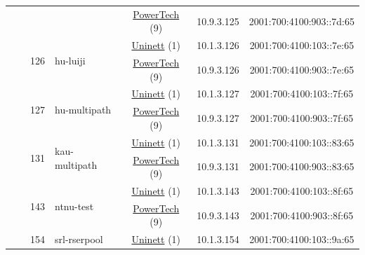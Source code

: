 \begin{small}
\begin{center}
\begin{longtable}{|c|c|c|c|c|c|c|c|}
  &  &  &  & \multicolumn{2}{|c|}{\tiny{\href{http://www.powertech.no}{PowerTech} (9)}} & \tiny{10.9.3.125} & \tiny{2001:700:4100:903::7d:65} \\* \cline{3-3}\cline{4-4}\cline{5-5}\cline{6-6}\cline{7-7}\cline{8-8}
  &  & \multirow{2}{*}{\tiny{126}} & \multicolumn{1}{|l|}{\multirow{2}{*}{\tiny{hu-luiji}}} & \multicolumn{2}{|c|}{\tiny{\href{https://www.uninett.no}{Uninett} (1)}} & \tiny{10.1.3.126} & \tiny{2001:700:4100:103::7e:65} \\* \cline{5-5}\cline{6-6}\cline{7-7}\cline{8-8}
  &  &  &  & \multicolumn{2}{|c|}{\tiny{\href{http://www.powertech.no}{PowerTech} (9)}} & \tiny{10.9.3.126} & \tiny{2001:700:4100:903::7e:65} \\* \cline{3-3}\cline{4-4}\cline{5-5}\cline{6-6}\cline{7-7}\cline{8-8}
  &  & \multirow{2}{*}{\tiny{127}} & \multicolumn{1}{|l|}{\multirow{2}{*}{\tiny{hu-multipath}}} & \multicolumn{2}{|c|}{\tiny{\href{https://www.uninett.no}{Uninett} (1)}} & \tiny{10.1.3.127} & \tiny{2001:700:4100:103::7f:65} \\* \cline{5-5}\cline{6-6}\cline{7-7}\cline{8-8}
  &  &  &  & \multicolumn{2}{|c|}{\tiny{\href{http://www.powertech.no}{PowerTech} (9)}} & \tiny{10.9.3.127} & \tiny{2001:700:4100:903::7f:65} \\* \cline{3-3}\cline{4-4}\cline{5-5}\cline{6-6}\cline{7-7}\cline{8-8}
  &  & \multirow{2}{*}{\tiny{131}} & \multicolumn{1}{|l|}{\multirow{2}{*}{\tiny{kau-multipath}}} & \multicolumn{2}{|c|}{\tiny{\href{https://www.uninett.no}{Uninett} (1)}} & \tiny{10.1.3.131} & \tiny{2001:700:4100:103::83:65} \\* \cline{5-5}\cline{6-6}\cline{7-7}\cline{8-8}
  &  &  &  & \multicolumn{2}{|c|}{\tiny{\href{http://www.powertech.no}{PowerTech} (9)}} & \tiny{10.9.3.131} & \tiny{2001:700:4100:903::83:65} \\* \cline{3-3}\cline{4-4}\cline{5-5}\cline{6-6}\cline{7-7}\cline{8-8}
  &  & \multirow{2}{*}{\tiny{143}} & \multicolumn{1}{|l|}{\multirow{2}{*}{\tiny{ntnu-test}}} & \multicolumn{2}{|c|}{\tiny{\href{https://www.uninett.no}{Uninett} (1)}} & \tiny{10.1.3.143} & \tiny{2001:700:4100:103::8f:65} \\* \cline{5-5}\cline{6-6}\cline{7-7}\cline{8-8}
  &  &  &  & \multicolumn{2}{|c|}{\tiny{\href{http://www.powertech.no}{PowerTech} (9)}} & \tiny{10.9.3.143} & \tiny{2001:700:4100:903::8f:65} \\* \cline{3-3}\cline{4-4}\cline{5-5}\cline{6-6}\cline{7-7}\cline{8-8}
  &  & \multirow{2}{*}{\tiny{154}} & \multicolumn{1}{|l|}{\multirow{2}{*}{\tiny{srl-rserpool}}} & \multicolumn{2}{|c|}{\tiny{\href{https://www.uninett.no}{Uninett} (1)}} & \tiny{10.1.3.154} & \tiny{2001:700:4100:103::9a:65} \\* \cline{5-5}\cline{6-6}\cline{7-7}\cline{8-8}

\end{longtable}
\end{center}
\end{small}
